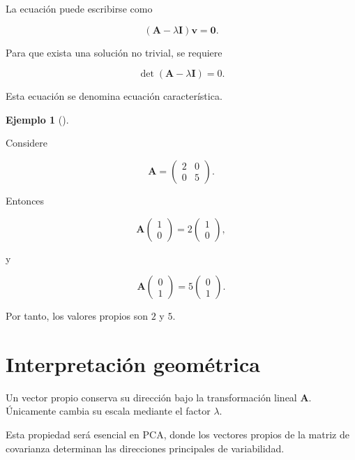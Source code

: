 \documentclass[
  spanish,
  10.5pt,
  letterpaper,
  DIV=11,
  numbers=noendperiod,
  oneside,
  open=any]{scrreprt}
\theoremstyle{definition}
\theoremstyle{definition}
\newtheorem{example}{Ejemplo}[chapter]
\theoremstyle{plain}
\theoremstyle{remark}
\begin{document}
La ecuación puede escribirse como

\[
(\mathbf{A}-\lambda\mathbf{I})\mathbf{v}
=
\mathbf{0}.
\]

Para que exista una solución no trivial, se requiere

\[
\det(\mathbf{A}-\lambda\mathbf{I})=0.
\]

Esta ecuación se denomina ecuación característica.

\begin{example}[]\protect\hypertarget{exm-valores-propios}{}\label{exm-valores-propios}

Considere

\[
\mathbf{A}
=
\begin{pmatrix}
2 & 0\\
0 & 5
\end{pmatrix}.
\]

Entonces

\[
\mathbf{A}
\begin{pmatrix}
1\\
0
\end{pmatrix}
=
2
\begin{pmatrix}
1\\
0
\end{pmatrix},
\]

y

\[
\mathbf{A}
\begin{pmatrix}
0\\
1
\end{pmatrix}
=
5
\begin{pmatrix}
0\\
1
\end{pmatrix}.
\]

Por tanto, los valores propios son \(2\) y \(5\).

\end{example}

\section*{Interpretación
geométrica}\label{interpretaciuxf3n-geomuxe9trica}


Un vector propio conserva su dirección bajo la transformación lineal
\(\mathbf{A}\). Únicamente cambia su escala mediante el factor
\(\lambda\).

Esta propiedad será esencial en PCA, donde los vectores propios de la
matriz de covarianza determinan las direcciones principales de
variabilidad.
\end{document}
